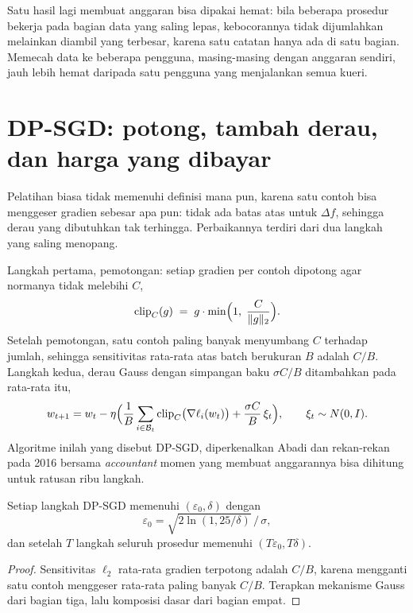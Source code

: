 Satu hasil lagi membuat anggaran bisa dipakai hemat: bila beberapa prosedur bekerja
pada bagian data yang saling lepas, kebocorannya tidak dijumlahkan melainkan diambil
yang terbesar, karena satu catatan hanya ada di satu bagian. Memecah data ke beberapa
pengguna, masing-masing dengan anggaran sendiri, jauh lebih hemat daripada satu pengguna
yang menjalankan semua kueri.


\section{DP-SGD: potong, tambah derau, dan harga yang dibayar}

Pelatihan biasa tidak memenuhi definisi mana pun, karena satu contoh bisa menggeser
gradien sebesar apa pun: tidak ada batas atas untuk $\Delta f$, sehingga derau yang
dibutuhkan tak terhingga. Perbaikannya terdiri dari dua langkah yang saling menopang.

Langkah pertama, pemotongan: setiap gradien per contoh dipotong agar normanya tidak
melebihi $C$,
\begin{equation}
\operatorname{clip}_C(g) \;=\; g\cdot\min\Bigl(1,\;\frac{C}{\|g\|_2}\Bigr).
\end{equation}
Setelah pemotongan, satu contoh paling banyak menyumbang $C$ terhadap jumlah, sehingga
sensitivitas rata-rata atas batch berukuran $B$ adalah $C/B$. Langkah kedua, derau
Gauss dengan simpangan baku $\sigma C/B$ ditambahkan pada rata-rata itu,
\begin{equation}
w_{t+1} = w_t - \eta\Bigl(\frac{1}{B}\sum_{i\in\mathcal{B}_t}
\operatorname{clip}_C\bigl(\nabla\ell_i(w_t)\bigr) + \frac{\sigma C}{B}\,\xi_t\Bigr),
\qquad \xi_t\sim N(0,I).
\end{equation}
Algoritme inilah yang disebut DP-SGD, diperkenalkan Abadi dan rekan-rekan pada 2016
bersama \emph{accountant} momen yang membuat anggarannya bisa dihitung untuk ratusan
ribu langkah.

\begin{teorema}
Setiap langkah DP-SGD memenuhi $(\varepsilon_0,\delta)$ dengan
\begin{equation}
\varepsilon_0=\sqrt{2\ln(1{,}25/\delta)}\,\big/\,\sigma ,
\end{equation}
dan setelah $T$ langkah seluruh prosedur memenuhi $(T\varepsilon_0,T\delta)$.
\end{teorema}

\begin{proof}
Sensitivitas $\ell_2$ rata-rata gradien terpotong adalah $C/B$, karena mengganti satu
contoh menggeser rata-rata paling banyak $C/B$. Terapkan mekanisme Gauss dari bagian
tiga, lalu komposisi dasar dari bagian empat.
\end{proof}

